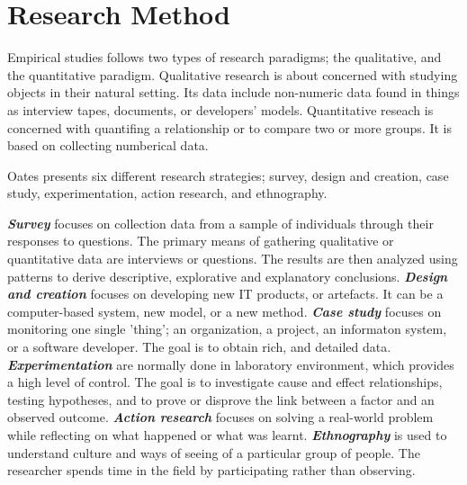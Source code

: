 \chapter{Research Method}
Empirical studies follows two types of research paradigms; the qualitative, and the quantitative paradigm\cite{Wohlin:2000:ESE:330775}. Qualitative research is about concerned with studying objects in their natural setting\cite{Wohlin:2000:ESE:330775}. Its data include non-numeric data found in things as interview tapes, documents, or developers' models\cite{Oates:2006:RIS:1202299}. Quantitative reseach is concerned with quantifing a relationship or to compare two or more groups\cite{Wohlin:2000:ESE:330775}. It is based on collecting numberical data\cite{Oates:2006:RIS:1202299}.

Oates\cite{Oates:2006:RIS:1202299} presents six different research strategies; survey, design and creation, case study, experimentation, action research, and ethnography. 

\textit{\textbf{Survey}} focuses on collection data from a sample of individuals through their responses to questions. The primary means of gathering qualitative or quantitative data are interviews or questions. The results are then analyzed using patterns to derive descriptive, explorative and explanatory conclusions. \textit{\textbf{Design and creation}} focuses on developing new IT products, or artefacts. It can be a computer-based system, new model, or a new method. \textit{\textbf{Case study}} focuses on monitoring one single 'thing'; an organization, a project, an informaton system, or a software developer. The goal is to obtain rich, and detailed data. \textit{\textbf{Experimentation}} are normally done in laboratory environment, which provides a high level of control. The goal is to investigate cause and effect relationships, testing hypotheses, and to prove or disprove the link between a factor and an observed outcome. \textit{\textbf{Action research}} focuses on solving a real-world problem while reflecting on what happened or what was learnt. \textit{\textbf{Ethnography}} is used to understand culture and ways of seeing of a particular group of people. The researcher spends time in the field by participating rather than observing.


